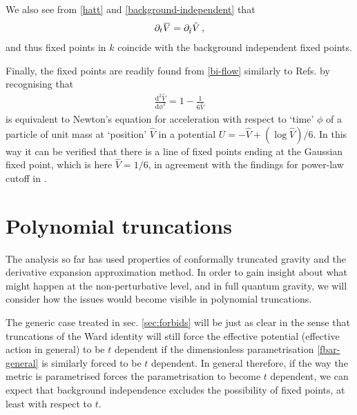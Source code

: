 \documentclass[11pt]{book}
\newcommand{\overbar}[1]{\mkern 1.5mu\overline{\mkern-1.5mu#1\mkern-1.5mu}\mkern 1.5mu}
\newcommand{\bV}{\overbar V}
\newcommand{\hV}{\hat V}
\newcommand{\hatt}{\hat t}
\numberwithin{equation}{chapter}
\begin{document}
We also see from \eqref{hatt} and \eqref{background-independent} that
\begin{align}
  \partial_t \bV = \partial_{\hatt} \hV\,,
\end{align}
and thus fixed points in $k$ coincide with the background independent fixed points.

Finally, the fixed points are readily found from \eqref{bi-flow} similarly to Refs.
\cite{Dietz:2016gzg,Morris:1994jc} by recognising that
\begin{align}
  \frac{\mathrm d^2\hV}{\mathrm d\phi^2} = 1-\frac{1}{6\hV}
\end{align}
is equivalent to Newton's equation for acceleration with respect to `time' $\phi$ of a particle
of unit mass at `position' $\hV$ in a potential $U=-\hV+ (\log\hV)/6$.
In this way it can be verified that there is a line of fixed points ending at the Gaussian fixed point,
which is here $\hV=1/6$, in agreement with the findings for power-law cutoff in \cite{Dietz:2016gzg}.


\section{Polynomial truncations}
\label{sec:truncations}

The analysis  so far has used properties of conformally truncated gravity and the derivative
expansion approximation method. In order to gain insight about what might happen at the non-perturbative level,
and in full quantum gravity, we will consider how the issues would become visible in polynomial truncations.

The generic case treated in sec. \ref{sec:forbids} will be just as clear in the sense that truncations
of the Ward identity will still force the effective potential (effective action in general) to be
$t$ dependent if the dimensionless parametrisation \eqref{fbar-general} is similarly forced to be $t$ dependent.
In general therefore, if the way the metric is parametrised forces the parametrisation to become $t$ dependent,
we can expect that background independence excludes the possibility of fixed points,
at least with respect to $t$.
\end{document}
